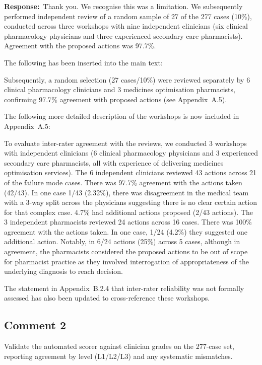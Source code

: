 \documentclass[11pt,a4paper]{article}
\newcounter{rcomment}
\newcommand{\response}{\noindent\textbf{Response:}\ }
\begin{document}
\response Thank you. We recognise this was a limitation. We subsequently performed independent review of a random sample of 27 of the 277 cases (10\%), conducted across three workshops with nine independent clinicians (six clinical pharmacology physicians and three experienced secondary care pharmacists). Agreement with the proposed actions was 97.7\%.

The following has been inserted into the main text:

\begin{manuscriptchange}
Subsequently, a random selection (27 cases/10\%) were reviewed separately by 6 clinical pharmacology clinicians and 3 medicines optimisation pharmacists, confirming 97.7\% agreement with proposed actions (see Appendix~A.5).
\end{manuscriptchange}

The following more detailed description of the workshops is now included in Appendix~A.5:

\begin{manuscriptchange}
To evaluate inter-rater agreement with the reviews, we conducted 3 workshops with independent clinicians (6 clinical pharmacology physicians and 3 experienced secondary care pharmacists, all with experience of delivering medicines optimisation services). The 6 independent clinicians reviewed 43 actions across 21 of the failure mode cases. There was 97.7\% agreement with the actions taken (42/43). In one case 1/43 (2.32\%), there was disagreement in the medical team with a 3-way split across the physicians suggesting there is no clear certain action for that complex case. 4.7\% had additional actions proposed (2/43 actions). The 3 independent pharmacists reviewed 24 actions across 16 cases. There was 100\% agreement with the actions taken. In one case, 1/24 (4.2\%) they suggested one additional action. Notably, in 6/24 actions (25\%) across 5 cases, although in agreement, the pharmacists considered the proposed actions to be out of scope for pharmacist practice as they involved interrogation of appropriateness of the underlying diagnosis to reach decision.
\end{manuscriptchange}

The statement in Appendix~B.2.4 that inter-rater reliability was not formally assessed has also been updated to cross-reference these workshops.

\subsection*{Comment 2}
\begin{reviewercomment}
Validate the automated scorer against clinician grades on the 277-case set, reporting agreement by level (L1/L2/L3) and any systematic mismatches.
\end{reviewercomment}
\end{document}
